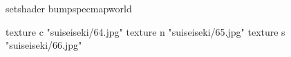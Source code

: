 setshader bumpspecmapworld

    texture c "suiseiseki/64.jpg"
    texture n "suiseiseki/65.jpg"
    texture s "suiseiseki/66.jpg"
